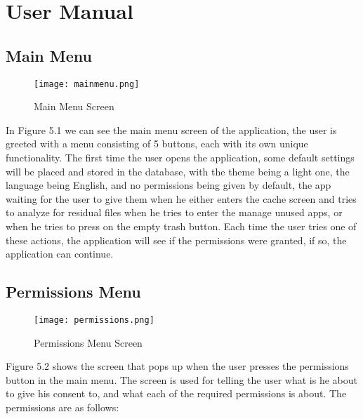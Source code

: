 
\chapter{User Manual}\label{chapter:chap5}

\section{Main Menu}\label{sect:Main Menu}

\begin{figure}[htp]
    \centering
    \texttt{[image: mainmenu.png]}
    \caption{Main Menu Screen}
    \label{fig: Main Menu Screen}
\end{figure}

In Figure 5.1 we can see the main menu screen of the application, the user is greeted with a menu consisting of 5 buttons, each with its own unique functionality. The first time the user opens the application, some default settings will be placed and stored in the database, with the theme being a light one, the language being English, and no permissions being given by default, the app waiting for the user to give them when he either enters the cache screen and tries to analyze for residual files when he tries to enter the manage unused apps, or when he tries to press on the empty trash button. Each time the user tries one of these actions, the application will see if the permissions were granted, if so, the application can continue. 

\section{Permissions Menu}\label{sect:Permissions Menu}

\begin{figure}[htp]
    \centering
    \texttt{[image: permissions.png]}
    \caption{Permissions Menu Screen}
    \label{fig: Permissions Menu Screen}
\end{figure}

Figure 5.2 shows the screen that pops up when the user presses the permissions button in the main menu. The screen is used for telling the user what is he about to give his consent to, and what each of the required permissions is about. The permissions are as follows: 

